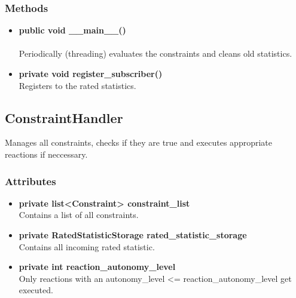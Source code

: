 \subsubsection{Methods}
\begin{itemize}
	\item \textbf{ public void \_\_main\_\_() }\\\\
		Periodically (threading) evaluates the constraints and cleans old statistics.
	\item \textbf{ private void register\_subscriber() }\\
		Registers to the rated statistics.
\end{itemize}



\subsection{ConstraintHandler}
Manages all constraints, checks if they are true and executes appropriate reactions if neccessary.

\subsubsection{Attributes}
\begin{itemize}
	\item \textbf{ private list<Constraint> constraint\_list }\\
		Contains a list of all constraints.
	\item \textbf{ private  RatedStatisticStorage rated\_statistic\_storage }\\
		Contains all incoming rated statistic.
	\item \textbf{ private  int reaction\_autonomy\_level }\\
		Only reactions with an autonomy\_level <= reaction\_autonomy\_level get executed.
\end{itemize}
